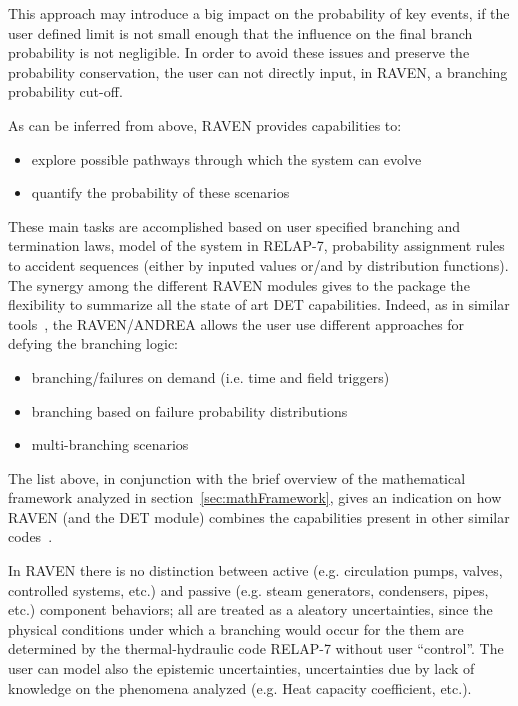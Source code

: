 \documentclass{mc2013}
\begin{document}
This approach may introduce a big impact on the probability of key events, if the user defined limit is not small enough that the influence on the final branch probability is not negligible.  In order to avoid these issues and preserve the probability conservation, the user can not directly input, in RAVEN, a branching probability cut-off. 

As can be inferred from above, RAVEN provides capabilities to:
\vspace{-5mm}
\begin{itemize}
\itemsep0em
\item explore possible pathways through which the system can evolve
\item quantify the probability of these scenarios
\end{itemize}
\vspace{-5mm}
These main tasks are accomplished based on user specified branching and termination laws, model of the system in RELAP-7, probability assignment rules to accident sequences (either by inputed values or/and by distribution functions).
The synergy among the different RAVEN modules gives to the package the flexibility to summarize all the state of art DET capabilities. 
Indeed, as in similar tools~\cite{ADAPTHakobyan}, the RAVEN/ANDREA allows the user use different approaches for defying the branching logic:
\vspace{-5mm}
\begin{itemize}
\itemsep0em
\item branching/failures on demand (i.e. time and field triggers)
\item branching based on failure probability distributions
\item multi-branching scenarios
\end{itemize}
\vspace{-5mm}
The list above, in conjunction with the brief overview of the mathematical framework analyzed in section~\ref{sec:mathFramework}, gives an indication on how RAVEN (and the DET module) combines the capabilities present in other similar codes~\cite{ADAPTHakobyan}.  

In RAVEN there is no distinction between active (e.g. circulation pumps, valves, controlled systems, etc.) and passive (e.g. steam generators, condensers, pipes, etc.) component behaviors; all are treated as a aleatory uncertainties, since the physical conditions under which a branching would occur for the them are determined by the thermal-hydraulic code RELAP-7 without user ``control''. The user can model also the epistemic uncertainties, uncertainties due by lack of knowledge on the phenomena analyzed (e.g. Heat capacity coefficient, etc.). 
\end{document}
